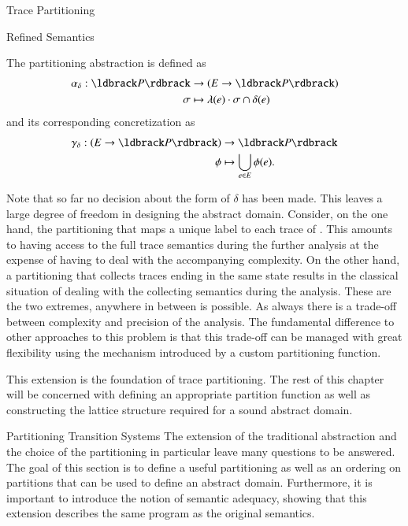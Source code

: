 \begin{chapter}{Trace Partitioning}
\begin{section}{Refined Semantics}
		\begin{definition}
			\label{definition:partitioningabstraction}
			The partitioning abstraction is defined as
			\begin{align}
				\alpha_\delta: \concrete{P} &\to (E \to \concrete{P})\\
				\sigma &\mapsto \lambda(e) \cdot \sigma \cap \delta(e) \notag
			\end{align}
			and its corresponding concretization as
			\begin{align}
				\gamma_\delta: (E \to \concrete{P}) &\to \concrete{P}\\
				\phi &\mapsto \bigcup_{e \in E} \phi(e). \notag
			\end{align}
		\end{definition}
		
		Note that so far no decision about the form of $\delta$ has been made. This leaves a large degree of freedom in designing the abstract domain. Consider, on the one hand, the partitioning that maps a unique label to each trace of . This amounts to having access to the full trace semantics during the further analysis at the expense of having to deal with the accompanying complexity. On the other hand, a partitioning that collects traces ending in the same state results in the classical situation of dealing with the collecting semantics during the analysis. These are the two extremes, anywhere in between is possible. As always there is a trade-off between complexity and precision of the analysis. The fundamental difference to other approaches to this problem is that this trade-off can be managed with great flexibility using the mechanism introduced by a custom partitioning function.
		
		This extension is the foundation of trace partitioning. The rest of this chapter will be concerned with defining an appropriate partition function as well as constructing the lattice structure required for a sound abstract domain.
	\end{section}


	\begin{section}{Partitioning Transition Systems}
		The extension of the traditional abstraction and the choice of the partitioning in particular leave many questions to be answered. The goal of this section is to define a useful partitioning as well as an ordering on partitions that can be used to define an abstract domain. Furthermore, it is important to introduce the notion of semantic adequacy, showing that this extension describes the same program as the original semantics.


\end{section}
\end{chapter}
